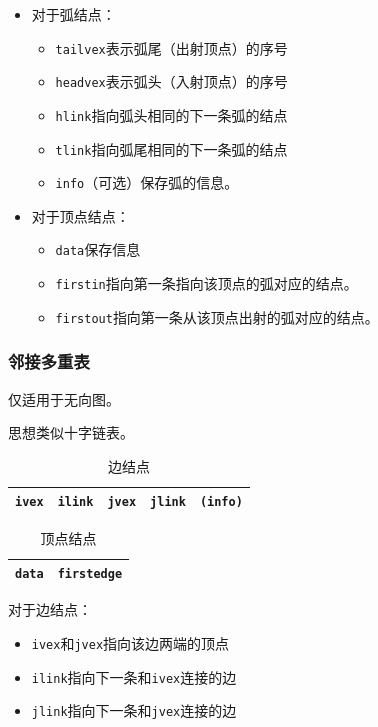 \documentclass[12pt, a4paper, oneside]{ctexart}
\begin{document}
\begin{itemize}
  \item 对于弧结点：
  \begin{itemize}
    \item \verb|tailvex|表示弧尾（出射顶点）的序号
    \item \verb|headvex|表示弧头（入射顶点）的序号
    \item \verb|hlink|指向弧头相同的下一条弧的结点
    \item \verb|tlink|指向弧尾相同的下一条弧的结点
    \item \verb|info|（可选）保存弧的信息。
  \end{itemize}
  \item 对于顶点结点：
  \begin{itemize}
    \item \verb|data|保存信息
    \item \verb|firstin|指向第一条指向该顶点的弧对应的结点。
    \item \verb|firstout|指向第一条从该顶点出射的弧对应的结点。
  \end{itemize}
\end{itemize}

\subsubsection{邻接多重表}

仅适用于无向图。

思想类似十字链表。

\begin{table}[h]
  \centering
  \caption*{边结点}
  \begin{tabular}{|c|c|c|c|c|}
    \hline
    \verb|ivex| & \verb|ilink| & \verb|jvex| & \verb|jlink| & \verb|(info)| \\
    \hline
  \end{tabular}
\end{table}

\begin{table}[h]
  \centering
  \caption*{顶点结点}
  \begin{tabular}{|c|c|}
    \hline
    \verb|data| & \verb|firstedge| \\
    \hline
  \end{tabular}
\end{table}

对于边结点：
\begin{itemize}
  \item \verb|ivex|和\verb|jvex|指向该边两端的顶点
  \item \verb|ilink|指向下一条和\verb|ivex|连接的边
  \item \verb|jlink|指向下一条和\verb|jvex|连接的边
\end{itemize}
\end{document}
